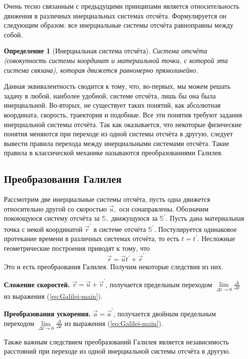 \documentclass[a5paper,11pt]{article}
\newtheorem{definition}{Определение}
\begin{document}
Очень тесно связанным с предыдущими принципами является относительность движения в различных
инерциальных системах отсчёта. Формулируется он следующим образом: все инерциальные системы отсчёта
равноправны между собой.
\begin{definition}[Инерциальная система отсчёта]
Система отсчёта (совокупность системы координат и матераильной точки, с которой эта система связана),
которая движется равномерно прямолинейно.
\end{definition}
Данная эквивалентность сводится к тому, что, во-первых, мы можем решать задачу в любой, наиболее удобной,
системе отсчёта, лишь бы она была инерциальной. Во-вторых, не существует таких понятий, как абсолютная
координата, скорость, траектория и подобные. Все эти понятия требуют задания инерциальной системы отсчёта.
Так как оказывается, что некоторые физические понятия меняются при переходе из одной системы отсчёта в другую,
следует вывести правила перехода между инерциальными системами отсчёта. Такие правила в классической механике называются
преобразованиями Галилея.
\subsection{Преобразования Галилея}
Рассмотрим две инерциальные системы отсчёта, пусть одна движется относительно
другой со скоростью $\vec{u},$ оси сонаправлены. Обозначим покоющуюся систему отсчёта
за $\mathbb{S},$ движущуюся за $\mathbb{S}^\prime.$ Пусть дана материальная точка с некой
координатой $\vec{r}^\prime$  в системе отсчёта $\mathbb{S}^\prime.$
Постулируется одинаковое протекание времени в различных системах отсчёта, то есть
$t = t^\prime$. Несложные геометрические построения приводят к тому, что
\begin{equation}
\vec{r} = \vec{u} t^\prime + \vec{r}^\prime
\label{eq:Galilei-main}
\end{equation}
Это и есть преобраования Галилея. Получим некоторые следствия из них.\par
\textbf{Сложение скоростей.} $\vec{v} = \vec{u} + \vec{v}^\prime$, получается
предельным переходом 
$\lim\limits_{\Delta t \to 0}\frac{\Delta}{\Delta t}$
из выражения (\ref{eq:Galilei-main}).\par
\textbf{Преобразования ускорения.} $\vec{a} = \vec{a}^\prime$, получается
двойным предельным переходом 
$\lim\limits_{\Delta t \to 0}\frac{\Delta}{\Delta t}$
из выражения (\ref{eq:Galilei-main}).\par
Также важным следствием преобразований Галилея является независимость расстояний
при переходе из одной инерциальной системы отсчёта в другую.
\end{document}
